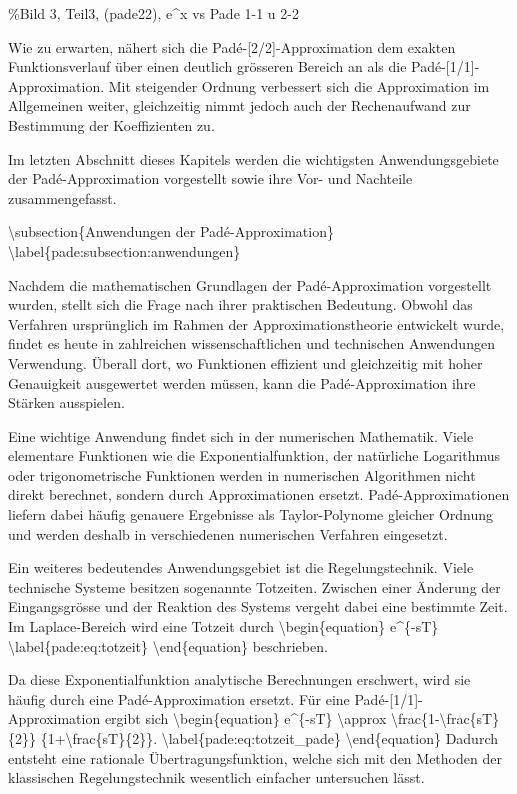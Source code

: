 \%Bild 3, Teil3, (pade22), e\^{}x vs Pade 1-1 u 2-2

Wie zu erwarten, nähert sich die Padé-{[}2/2{]}-Approximation dem
exakten Funktionsverlauf über einen deutlich grösseren Bereich an als
die Padé-{[}1/1{]}-Approximation. Mit steigender Ordnung verbessert sich
die Approximation im Allgemeinen weiter, gleichzeitig nimmt jedoch auch
der Rechenaufwand zur Bestimmung der Koeffizienten zu.

Im letzten Abschnitt dieses Kapitels werden die wichtigsten
Anwendungsgebiete der Padé-Approximation vorgestellt sowie ihre Vor- und
Nachteile zusammengefasst.

\textbackslash subsection\{Anwendungen der Padé-Approximation\}
\textbackslash label\{pade:subsection:anwendungen\}

Nachdem die mathematischen Grundlagen der Padé-Approximation vorgestellt
wurden, stellt sich die Frage nach ihrer praktischen Bedeutung. Obwohl
das Verfahren ursprünglich im Rahmen der Approximationstheorie
entwickelt wurde, findet es heute in zahlreichen wissenschaftlichen und
technischen Anwendungen Verwendung. Überall dort, wo Funktionen
effizient und gleichzeitig mit hoher Genauigkeit ausgewertet werden
müssen, kann die Padé-Approximation ihre Stärken ausspielen.

Eine wichtige Anwendung findet sich in der numerischen Mathematik. Viele
elementare Funktionen wie die Exponentialfunktion, der natürliche
Logarithmus oder trigonometrische Funktionen werden in numerischen
Algorithmen nicht direkt berechnet, sondern durch Approximationen
ersetzt. Padé-Approximationen liefern dabei häufig genauere Ergebnisse
als Taylor-Polynome gleicher Ordnung und werden deshalb in verschiedenen
numerischen Verfahren eingesetzt.

Ein weiteres bedeutendes Anwendungsgebiet ist die Regelungstechnik.
Viele technische Systeme besitzen sogenannte Totzeiten. Zwischen einer
Änderung der Eingangsgrösse und der Reaktion des Systems vergeht dabei
eine bestimmte Zeit. Im Laplace-Bereich wird eine Totzeit durch
\textbackslash begin\{equation\} e\^{}\{-sT\}
\textbackslash label\{pade:eq:totzeit\} \textbackslash end\{equation\}
beschrieben.

Da diese Exponentialfunktion analytische Berechnungen erschwert, wird
sie häufig durch eine Padé-Approximation ersetzt. Für eine
Padé-{[}1/1{]}-Approximation ergibt sich
\textbackslash begin\{equation\} e\^{}\{-sT\} \textbackslash approx
\textbackslash frac\{1-\textbackslash frac\{sT\}\{2\}\}
\{1+\textbackslash frac\{sT\}\{2\}\}.
\textbackslash label\{pade:eq:totzeit\_pade\}
\textbackslash end\{equation\} Dadurch entsteht eine rationale
Übertragungsfunktion, welche sich mit den Methoden der klassischen
Regelungstechnik wesentlich einfacher untersuchen lässt.

